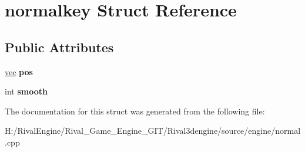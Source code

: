 \hypertarget{structnormalkey}{}\section{normalkey Struct Reference}
\label{structnormalkey}
\subsection*{Public Attributes}
\begin{DoxyCompactItemize}
\item 
\mbox{\label{structnormalkey_af45cfb4aef907e60dd67ad61c485e495}} 
\hyperlink{structvec}{vec} {\bfseries pos}
\item 
\mbox{\label{structnormalkey_a0e29a2e3b9bb99d3c36062de01f7822a}} 
int {\bfseries smooth}
\end{DoxyCompactItemize}


The documentation for this struct was generated from the following file\+:\begin{DoxyCompactItemize}
\item 
H\+:/\+Rival\+Engine/\+Rival\+\_\+\+Game\+\_\+\+Engine\+\_\+\+G\+I\+T/\+Rival3dengine/source/engine/normal.\+cpp\end{DoxyCompactItemize}
